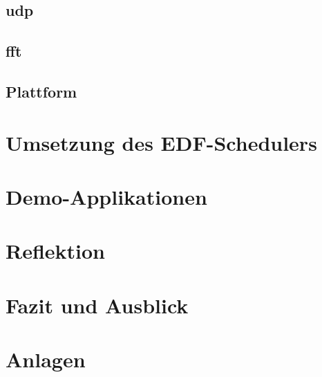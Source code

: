 \documentclass{scrartcl}
\begin{document}
		\subsection{\acf{udp}} \label{section:udp}
			
			\clearpage
		\subsection{\acf{fft}} \label{section:fft}
			
		\clearpage
		\subsection{Plattform} \label{section:plattform}
			
	\clearpage
	\section{Umsetzung des EDF-Schedulers} \label{section:der_edf_scheduler}
		
	\clearpage
	\section{Demo-Applikationen} \label{section:demo_applikationen}
		
	\clearpage
	\section{Reflektion} \label{section:aufgetretene_probleme}
		
	\clearpage
	\section{Fazit und Ausblick} \label{section:fazit_und_ausblick}
		
	\clearpage
	\printbibliography{}
	\clearpage
	\section{Anlagen} \label{section:anlagen}
		
\end{document}
